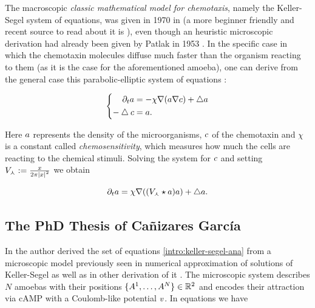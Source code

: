 The macroscopic \emph{classic mathematical model for chemotaxis}, namely the Keller-Segel system of equations, was given in 1970 in \cite{keller-segel} (a more beginner friendly and recent source to read about it is \cite{guide-pdes-chemotaxis}), even though an heuristic microscopic derivation had already been given by Patlak in 1953 \cite{patlak}.
In the specific case in which the chemotaxin molecules diffuse much faster than the organism reacting to them (as it is the case for the aforementioned amoeba), one can derive from the general case this parabolic-elliptic system of equations \cite{keller-segel-reduced}:

\begin{equation}\label{intro:keller-segel-ana}
	\left\{
	\begin{aligned}
		\partial_t a &= - \chi \nabla (a \nabla c) + \bigtriangleup a
		\\
		-\bigtriangleup c &= a.
	\end{aligned}
	\right.
\end{equation}

Here $a$ represents the density of the microorganisms, $c$ of the chemotaxin and $\chi$ is a constant called \emph{chemosensitivity}, which measures how much the cells are reacting to the chemical stimuli.
Solving the system \label{intro:keller-segel-ana} for $c$ and setting $V_\curlywedge:=\frac{x}{2\pi \left| x \right|^2}$ we obtain

\begin{equation}\label{intro:keller-segel-ana-1-equation}
	\partial_t a = \chi \nabla ( (V_\curlywedge \star a) a) + \bigtriangleup a.
\end{equation}

\subsection{The PhD Thesis of Cañizares García}

In \cite{ana} the author derived the set of equations \ref{intro:keller-segel-ana} from a microscopic model previously seen in numerical approximation of solutions of Keller-Segel \cite{numerics-keller-segel} as well as in other derivation of it \cite{keller-segel-dd-derivation-previously}.
The microscopic system describes $N$ amoebas with their positions $\{A^1, \ldots, A^N\}\in\mathbb{R}^2$ and encodes their attraction via cAMP with a Coulomb-like potential $v$.
In equations we have

